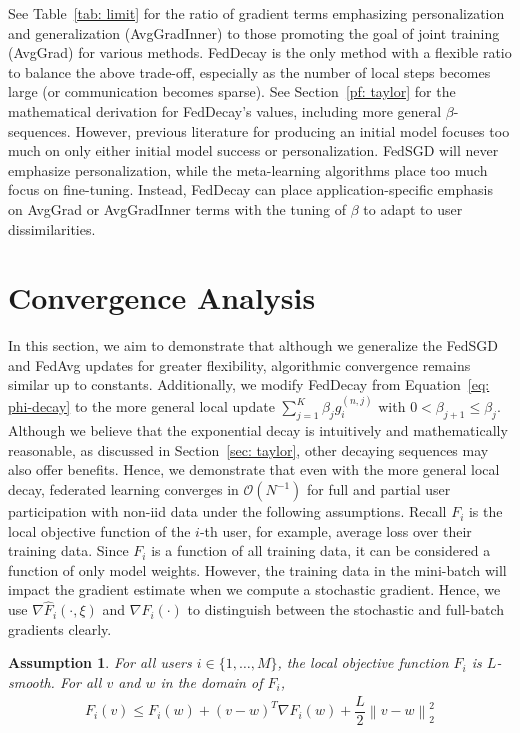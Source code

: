 \documentclass{article}
\newtheorem{assumption}{Assumption}
\newcommand\norm[1]{\left\lVert#1\right\rVert}
\begin{document}
\medskip
See Table~\ref{tab: limit} for the ratio of gradient terms emphasizing personalization and generalization (AvgGradInner) to those promoting the goal of joint training (AvgGrad) for various methods.
FedDecay is the only method with a flexible ratio to balance the above trade-off, especially as the number of local steps becomes large (or communication becomes sparse).
See Section~\ref{pf: taylor} for the mathematical derivation for FedDecay's values, including more general $\beta$-sequences.
However, previous literature for producing an initial model focuses too much on only either initial model success or personalization. 
FedSGD will never emphasize personalization, while the meta-learning algorithms place too much focus on fine-tuning.
Instead, FedDecay can place application-specific emphasis on AvgGrad or AvgGradInner terms with the tuning of $\beta$ to adapt to user dissimilarities. 




%
\section{Convergence Analysis}
\label{sec: conv}

In this section, we aim to demonstrate that although we generalize the FedSGD and FedAvg updates for greater flexibility, algorithmic convergence remains similar up to constants.
Additionally, we modify FedDecay from Equation~\ref{eq: phi-decay} to the more general local update $\sum_{j = 1}^K \beta_j g_i^{(n, j)}$ with ${0 < \beta_{j + 1} \leq \beta_j}$.
Although we believe that the exponential decay is intuitively and mathematically reasonable, as discussed in Section~\ref{sec: taylor}, other decaying sequences may also offer benefits.
Hence, we demonstrate that even with the more general local decay, federated learning converges in $\mathcal{O}(N^{-1})$ for full and partial user participation with non-iid data under the following assumptions.
Recall $F_i$ is the local objective function of the $i$-th user, for example, average loss over their training data.
Since $F_i$ is a function of all training data, it can be considered a function of only model weights.
However, the training data in the mini-batch will impact the gradient estimate when we compute a stochastic gradient. 
Hence, we use $\nabla \hat F_i(\cdot, \xi)$ and $\nabla F_i(\cdot)$ to distinguish between the stochastic and full-batch gradients clearly.

\begin{assumption}
\label{ass: lipschitz}
    For all users $i \in \{1, \ldots, M\}$, the local objective function $F_i$ is $L$-smooth. For all $v$ and $w$ in the domain of $F_i$, 
    \begin{align*}
        F_i(v) \leq F_i(w) + (v - w)^T \nabla F_i(w) + \dfrac{L}{2} \norm{v - w}_2^2 
    \end{align*}
\end{assumption}
\end{document}
